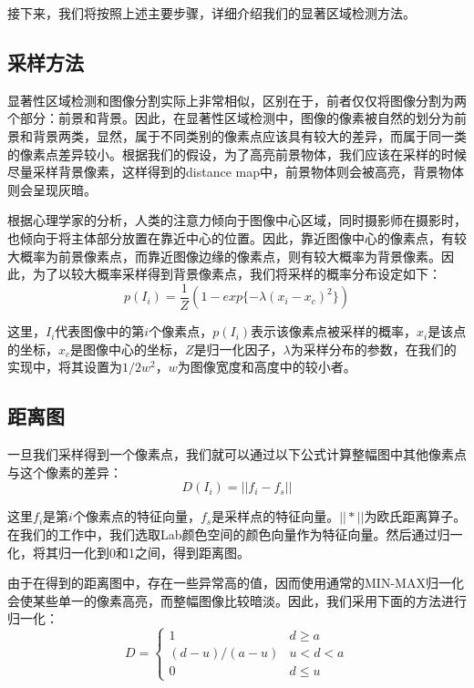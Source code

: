 接下来，我们将按照上述主要步骤，详细介绍我们的显著区域检测方法。

\subsection{采样方法}
显著性区域检测和图像分割实际上非常相似，区别在于，前者仅仅将图像分割为两个部分：前景和背景。因此，在显著性区域检测中，图像的像素被自然的划分为前景和背景两类，显然，属于不同类别的像素点应该具有较大的差异，而属于同一类的像素点差异较小。根据我们的假设，为了高亮前景物体，我们应该在采样的时候尽量采样背景像素，这样得到的distance map中，前景物体则会被高亮，背景物体则会呈现灰暗。

根据心理学家的分析\cite{tatler2007central}，人类的注意力倾向于图像中心区域，同时摄影师在摄影时，也倾向于将主体部分放置在靠近中心的位置。因此，靠近图像中心的像素点，有较大概率为前景像素点，而靠近图像边缘的像素点，则有较大概率为背景像素。因此，为了以较大概率采样得到背景像素点，我们将采样的概率分布设定如下：
\begin{equation}
p(I_i) = \frac{1}{Z}(1-exp\{-\lambda(x_i-x_c)^2\})
\end{equation}

这里，$I_i$代表图像中的第$i$个像素点，$p(I_i)$表示该像素点被采样的概率，$x_i$是该点的坐标，$x_c$是图像中心的坐标，$Z$是归一化因子，$\lambda$为采样分布的参数，在我们的实现中，将其设置为$1/2w^2$，$w$为图像宽度和高度中的较小者。

\subsection{距离图}
一旦我们采样得到一个像素点，我们就可以通过以下公式计算整幅图中其他像素点与这个像素的差异：
\begin{equation}
D(I_i) = ||f_i - f_s|| \label{eq:dis}
\end{equation}

这里$f_i$是第$i$个像素点的特征向量，$f_s$是采样点的特征向量。$||*||$为欧氏距离算子。在我们的工作中，我们选取Lab颜色空间的颜色向量作为特征向量。然后通过归一化，将其归一化到0和1之间，得到距离图。

由于在得到的距离图中，存在一些异常高的值，因而使用通常的MIN-MAX归一化会使某些单一的像素高亮，而整幅图像比较暗淡。因此，我们采用下面的方法进行归一化：
\begin{equation}
D = 
\begin{cases}
1& d \geq a\\
(d-u)/(a-u) & u<d<a\\
0& d \leq u
\end{cases}
\end{equation}

